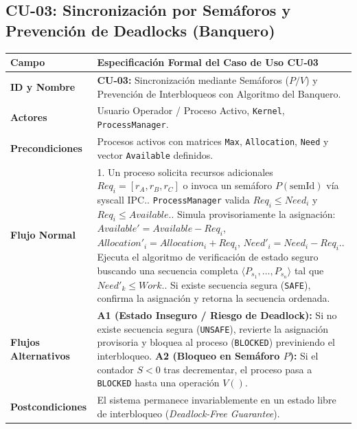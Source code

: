 \documentclass[10pt,twocolumn,letterpaper]{article}
\begin{document}
\subsection{CU-03: Sincronizaci\'on por Sem\'aforos y Prevenci\'on de Deadlocks (Banquero)}
\begin{table}[!htb]
\centering
\scriptsize
\renewcommand{\arraystretch}{1.12}
\begin{tabularx}{\columnwidth}{L{2.1cm} Y}
\toprule
\textbf{Campo} & \textbf{Especificaci\'on Formal del Caso de Uso CU-03} \\
\midrule
\textbf{ID y Nombre} & \textbf{CU-03:} Sincronizaci\'on mediante Sem\'aforos ($P/V$) y Prevenci\'on de Interbloqueos con Algoritmo del Banquero. \\
\textbf{Actores} & Usuario Operador / Proceso Activo, \texttt{Kernel}, \texttt{ProcessManager}. \\
\textbf{Precondiciones} & Procesos activos con matrices \texttt{Max}, \texttt{Allocation}, \texttt{Need} y vector \texttt{Available} definidos. \\
\textbf{Flujo Normal} & 1. Un proceso solicita recursos adicionales $Req_i = [r_A, r_B, r_C]$ o invoca un sem\'aforo $P(\text{semId})$ v\'ia syscall IPC.. \texttt{ProcessManager} valida $Req_i \le Need_i$ y $Req_i \le Available$.. Simula provisoriamente la asignaci\'on: $Available' = Available - Req_i$, $Allocation'_i = Allocation_i + Req_i$, $Need'_i = Need_i - Req_i$.. Ejecuta el algoritmo de verificaci\'on de estado seguro buscando una secuencia completa $\langle P_{s_1}, \dots, P_{s_n} \rangle$ tal que $Need'_k \le Work$.. Si existe secuencia segura (\texttt{SAFE}), confirma la asignaci\'on y retorna la secuencia ordenada. \\
\textbf{Flujos Alternativos} & \textbf{A1 (Estado Inseguro / Riesgo de Deadlock):} Si no existe secuencia segura (\texttt{UNSAFE}), revierte la asignaci\'on provisoria y bloquea al proceso (\texttt{BLOCKED}) previniendo el interbloqueo.\newline
\textbf{A2 (Bloqueo en Sem\'aforo $P$):} Si el contador $S < 0$ tras decrementar, el proceso pasa a \texttt{BLOCKED} hasta una operaci\'on $V()$. \\
\textbf{Postcondiciones} & El sistema permanece invariablemente en un estado libre de interbloqueo (\textit{Deadlock-Free Guarantee}). \\
\bottomrule
\end{tabularx}
\end{table}
\end{document}
